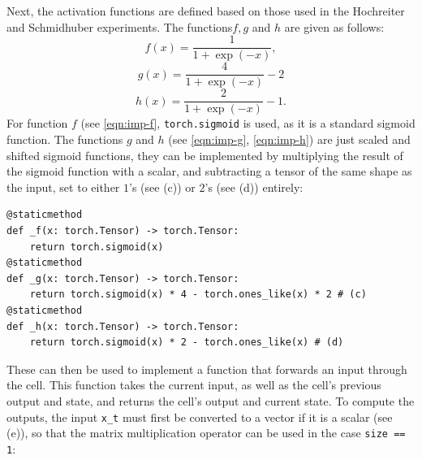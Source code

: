 \documentclass[twoside,a4paper,10pt,DIV=12,BCOR=12mm]{scrartcl}
\begin{document}
Next, the activation functions are defined based on those used in the Hochreiter and Schmidhuber experiments. The functions\begin{math}f, g\end{math} and \begin{math} h \end{math} are given as follows: \cite{hochreiter1997lstm}
\begin{equation}
    \label{eqn:imp-f}
    f(x)=\frac{1}{1+\exp(-x)},
\end{equation}
\begin{equation}
\label{eqn:imp-g}
    g(x)=\frac{4}{1+\exp(-x)}-2
\end{equation}
\begin{equation}
    \label{eqn:imp-h}
    h(x)=\frac{2}{1+\exp(-x)}-1.
\end{equation}
For function \begin{math}f\end{math} (see \ref{eqn:imp-f}, \lstinline{torch.sigmoid} is used, as it is a standard sigmoid function. The functions \begin{math}g\end{math} and \begin{math}h\end{math} (see \ref{eqn:imp-g}, \ref{eqn:imp-h}) are just scaled and shifted sigmoid functions, they can be implemented by multiplying the result of the sigmoid function with a scalar, and subtracting a tensor of the same shape as the input, set to either \begin{math}1\end{math}'s (see (c)) or \begin{math}2\end{math}'s (see (d)) entirely:\cite{hochreiter1997lstm, pytorch-lstm}
\begin{lstlisting}
@staticmethod
def _f(x: torch.Tensor) -> torch.Tensor:
    return torch.sigmoid(x)
@staticmethod
def _g(x: torch.Tensor) -> torch.Tensor:
    return torch.sigmoid(x) * 4 - torch.ones_like(x) * 2 # (c)
@staticmethod
def _h(x: torch.Tensor) -> torch.Tensor:
    return torch.sigmoid(x) * 2 - torch.ones_like(x) # (d)
\end{lstlisting}
These can then be used to implement a function that forwards an input through the cell. This function takes the current input, as well as the cell's previous output and state, and returns the cell's output and current state. To compute the outputs, the input \lstinline{x_t} must first be converted to a vector if it is a scalar (see (e)), so that the matrix multiplication operator can be used in the case \lstinline{size == 1}:\cite{keras-lstm, pytorch-lstm}
\end{document}
